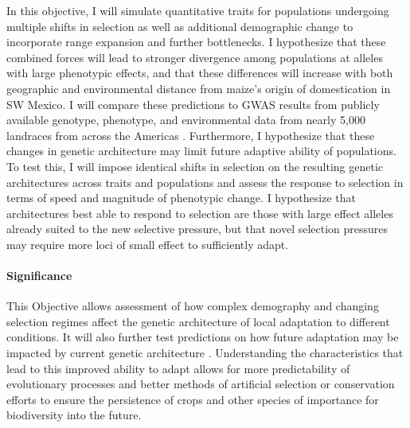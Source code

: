 In this objective, I will simulate quantitative traits for populations undergoing multiple shifts in selection as well as additional demographic change to incorporate range expansion and further bottlenecks. I hypothesize that these combined forces will lead to stronger divergence among populations at alleles with large phenotypic effects, and that these differences will increase with both geographic and environmental distance from maize's origin of domestication in SW Mexico. I will compare these predictions to GWAS results from publicly available genotype, phenotype, and environmental data from nearly 5,000 landraces from across the Americas \citep{Hearne2015}. Furthermore, I hypothesize that these changes in genetic architecture may limit future adaptive ability of populations. To test this, I will impose identical shifts in selection on the resulting genetic architectures across traits and populations and assess the response to selection in terms of speed and magnitude of phenotypic change. I hypothesize that architectures best able to respond to selection are those with large effect alleles already suited to the new selective pressure, but that novel selection pressures may require more loci of small effect to sufficiently adapt.

\vspace{-2ex}
\paragraph{Significance}
This Objective allows assessment of how complex demography and changing selection regimes affect the genetic architecture of local adaptation to different conditions. It will also further test predictions on how future adaptation may be impacted by current genetic architecture \citep{Yeaman:2015cc}. Understanding the characteristics that lead to this improved ability to adapt allows for more predictability of evolutionary processes and better methods of artificial selection or conservation efforts to ensure the persistence of crops and other species of importance for biodiversity into the future.
\vspace{-3ex}


